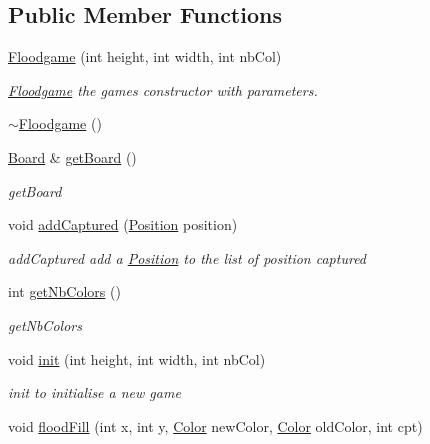 \subsection*{Public Member Functions}
\begin{DoxyCompactItemize}
\item 
\hyperlink{classoli_1_1_floodgame_ac411db6e80baa3e2a9c41d7ee71fd006}{Floodgame} (int height, int width, int nb\+Col)
\begin{DoxyCompactList}\small\item\em \hyperlink{classoli_1_1_floodgame}{Floodgame} the game\textquotesingle{}s constructor with parameters. \end{DoxyCompactList}\item 
\hyperlink{classoli_1_1_floodgame_a3e27addbd04a0eb2d27fbe05abf482f7}{$\sim$\+Floodgame} ()
\item 
\hyperlink{classoli_1_1_board}{Board} \& \hyperlink{classoli_1_1_floodgame_a4775f2321f034778d4de93a888d2283b}{get\+Board} ()
\begin{DoxyCompactList}\small\item\em get\+Board \end{DoxyCompactList}\item 
void \hyperlink{classoli_1_1_floodgame_a257b5c182fe3c40242308a6b234b75c8}{add\+Captured} (\hyperlink{classoli_1_1_position}{Position} position)
\begin{DoxyCompactList}\small\item\em add\+Captured add a \hyperlink{classoli_1_1_position}{Position} to the list of position captured \end{DoxyCompactList}\item 
int \hyperlink{classoli_1_1_floodgame_a6ffeda1d46639b093de8892b45e7bf06}{get\+Nb\+Colors} ()
\begin{DoxyCompactList}\small\item\em get\+Nb\+Colors \end{DoxyCompactList}\item 
void \hyperlink{classoli_1_1_floodgame_a2f1bf35c7c7077bccf8576324ccf60ed}{init} (int height, int width, int nb\+Col)
\begin{DoxyCompactList}\small\item\em init to initialise a new game \end{DoxyCompactList}\item 
void \hyperlink{classoli_1_1_floodgame_abf954b3e365ada491163de9ad956bd95}{flood\+Fill} (int x, int y, \hyperlink{namespaceoli_aac44697e43b3ab2ad32fe892ab2276eb}{Color} new\+Color, \hyperlink{namespaceoli_aac44697e43b3ab2ad32fe892ab2276eb}{Color} old\+Color, int cpt)

\end{DoxyCompactItemize}
